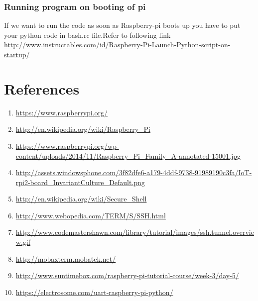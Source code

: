 \documentclass[11pt,a4paper]{report}
\begin{document}
\begin{flushleft}
	
		\newpage
		\subsection{Running program on booting of pi}
		If we want to run the code as soon as Raspberry-pi boots up you have to put your python code in bash.rc file.Refer to following link \url{http://www.instructables.com/id/Raspberry-Pi-Launch-Python-script-on-startup/}
	\chapter{References}
		\begin{enumerate}
		\item \url{https://www.raspberrypi.org/}
		\item \url{http://en.wikipedia.org/wiki/Raspberry_Pi}	
		\item \url{https://www.raspberrypi.org/wp-content/uploads/2014/11/Raspberry_Pi_Family_A-annotated-15001.jpg}
		\item \url{http://assets.windowsphone.com/3f82dfe6-a179-4ddf-9738-91989190c3fa/IoT-rpi2-board_InvariantCulture_Default.png}	
		\item \url{http://en.wikipedia.org/wiki/Secure_Shell}
		\item \url{http://www.webopedia.com/TERM/S/SSH.html}
		\item \url{http://www.codemastershawn.com/library/tutorial/images/ssh.tunnel.overview.gif}
		\item \url{http://mobaxterm.mobatek.net/}
		\item \url{http://www.suntimebox.com/raspberry-pi-tutorial-course/week-3/day-5/}
		\item \url{https://electrosome.com/uart-raspberry-pi-python/}
	\end{enumerate}
	
	
\end{flushleft}
\end{document}
